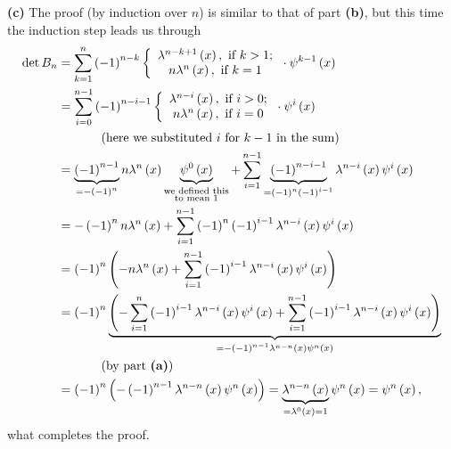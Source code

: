 \documentclass[numbers=enddot,12pt,final,onecolumn,notitlepage]{scrartcl}%
\begin{document}
\textbf{(c)} The proof (by induction over $n$) is similar to that of part
\textbf{(b)}, but this time the induction step leads us through%
\begin{align*}
\det B_{n}  &  =\sum_{k=1}^{n}\left(  -1\right)  ^{n-k}\left\{
\begin{array}
[c]{c}%
\lambda^{n-k+1}\left(  x\right)  ,\text{ if }k>1;\\
n\lambda^{n}\left(  x\right)  ,\text{ if }k=1
\end{array}
\right.  \cdot\psi^{k-1}\left(  x\right) \\
&  =\sum_{i=0}^{n-1}\left(  -1\right)  ^{n-i-1}\left\{
\begin{array}
[c]{c}%
\lambda^{n-i}\left(  x\right)  ,\text{ if }i>0;\\
n\lambda^{n}\left(  x\right)  ,\text{ if }i=0
\end{array}
\right.  \cdot\psi^{i}\left(  x\right) \\
&  \ \ \ \ \ \ \ \ \ \ \left(  \text{here we substituted }i\text{ for
}k-1\text{ in the sum}\right) \\
&  =\underbrace{\left(  -1\right)  ^{n-1}}_{=-\left(  -1\right)  ^{n}}%
n\lambda^{n}\left(  x\right)  \underbrace{\psi^{0}\left(  x\right)
}_{\substack{\text{we defined this}\\\text{to mean }1}}+\sum_{i=1}%
^{n-1}\underbrace{\left(  -1\right)  ^{n-i-1}}_{=\left(  -1\right)
^{n}\left(  -1\right)  ^{i-1}}\lambda^{n-i}\left(  x\right)  \psi^{i}\left(
x\right) \\
&  =-\left(  -1\right)  ^{n}n\lambda^{n}\left(  x\right)  +\sum_{i=1}%
^{n-1}\left(  -1\right)  ^{n}\left(  -1\right)  ^{i-1}\lambda^{n-i}\left(
x\right)  \psi^{i}\left(  x\right) \\
&  =\left(  -1\right)  ^{n}\left(  -n\lambda^{n}\left(  x\right)  +\sum
_{i=1}^{n-1}\left(  -1\right)  ^{i-1}\lambda^{n-i}\left(  x\right)  \psi
^{i}\left(  x\right)  \right) \\
&  =\left(  -1\right)  ^{n}\underbrace{\left(  -\sum_{i=1}^{n}\left(
-1\right)  ^{i-1}\lambda^{n-i}\left(  x\right)  \psi^{i}\left(  x\right)
+\sum_{i=1}^{n-1}\left(  -1\right)  ^{i-1}\lambda^{n-i}\left(  x\right)
\psi^{i}\left(  x\right)  \right)  }_{=-\left(  -1\right)  ^{n-1}\lambda
^{n-n}\left(  x\right)  \psi^{n}\left(  x\right)  }\\
&  \ \ \ \ \ \ \ \ \ \ \left(  \text{by part \textbf{(a)}}\right) \\
&  =\left(  -1\right)  ^{n}\left(  -\left(  -1\right)  ^{n-1}\lambda
^{n-n}\left(  x\right)  \psi^{n}\left(  x\right)  \right)
=\underbrace{\lambda^{n-n}\left(  x\right)  }_{=\lambda^{0}\left(  x\right)
=1}\psi^{n}\left(  x\right)  =\psi^{n}\left(  x\right)  ,
\end{align*}
what completes the proof.
\end{document}
